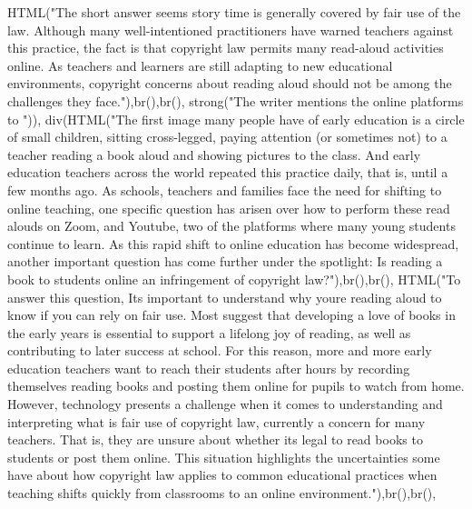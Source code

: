 \documentclass[
]{article}
\newenvironment{Shaded}{\begin{snugshade}}{\end{snugshade}}
\newcommand{\FunctionTok}[1]{\textcolor[rgb]{0.00,0.00,0.00}{#1}}
\newcommand{\NormalTok}[1]{#1}
\newcommand{\StringTok}[1]{\textcolor[rgb]{0.31,0.60,0.02}{#1}}
\begin{document}
\begin{Shaded}
\begin{Highlighting}[]
               \FunctionTok{HTML}\NormalTok{(}\StringTok{"The short answer seems story time is generally covered by fair use of the law. Although many well{-}intentioned practitioners have warned teachers against this practice, the fact is that copyright law permits many read{-}aloud activities online. As teachers and learners are still adapting to new educational environments, copyright concerns about reading aloud should not be among the challenges they face."}\NormalTok{),}\FunctionTok{br}\NormalTok{(),}\FunctionTok{br}\NormalTok{(),}
               \FunctionTok{strong}\NormalTok{(}\StringTok{"The writer mentions the online platforms to "}\NormalTok{)),}
           \FunctionTok{div}\NormalTok{(}\FunctionTok{HTML}\NormalTok{(}\StringTok{"The first image many people have of early education is a circle of small children, sitting cross{-}legged, paying attention (or sometimes not) to a teacher reading a book aloud and showing pictures to the class. And early education teachers across the world repeated this practice daily, that is, until a few months ago. As schools, teachers and families face the need for shifting to online teaching, one  specific question has arisen over how to perform these read alouds on Zoom, and Youtube, two of the platforms where many young students continue to learn. As this rapid shift to online education has become widespread, another important question has come further under the spotlight: Is reading a book to students online an infringement of copyright law?"}\NormalTok{),}\FunctionTok{br}\NormalTok{(),}\FunctionTok{br}\NormalTok{(), }
               \FunctionTok{HTML}\NormalTok{(}\StringTok{"To answer this question, Its important to understand why youre reading aloud to know if you can rely on fair use. Most suggest that developing a love of books in the early years is essential to support a lifelong joy of reading, as well as contributing to later success at school. For this reason, more and more early education teachers want to reach their students after hours by recording themselves reading books and posting them online for pupils to watch from home. However, technology presents a challenge when it comes to understanding and interpreting what is fair use of copyright law, currently a concern for many teachers. That is, they are unsure about whether its legal to read books to students or post them online. This situation highlights the uncertainties some have about how copyright law applies to common educational practices when teaching shifts quickly from classrooms to an online environment."}\NormalTok{),}\FunctionTok{br}\NormalTok{(),}\FunctionTok{br}\NormalTok{(), }

\end{Highlighting}
\end{Shaded}
\end{document}
